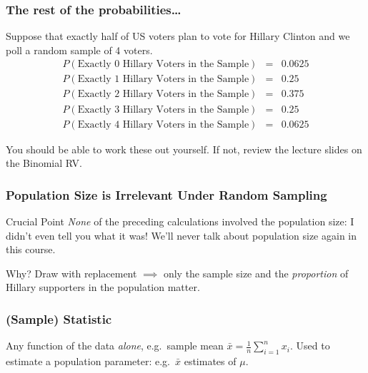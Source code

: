 %
%
\begin{frame}
  \frametitle{The rest of the probabilities\dots}
  Suppose that exactly half of US voters plan to vote for Hillary Clinton and we poll a random sample of 4 voters.
  \begin{eqnarray*}
    P\left( \mbox{Exactly 0 Hillary Voters in the Sample} \right) &=& 0.0625\\
    P\left( \mbox{Exactly 1 Hillary Voters in the Sample} \right) &=& 0.25\\
    P\left( \mbox{Exactly 2 Hillary Voters in the Sample} \right) &=& 0.375\\
    P\left( \mbox{Exactly 3 Hillary Voters in the Sample} \right) &=& 0.25\\
    P\left( \mbox{Exactly 4 Hillary Voters in the Sample} \right) &=& 0.0625 
  \end{eqnarray*}

  \vspace{1em}
  \alert{You should be able to work these out yourself. If not, review the lecture slides on the Binomial RV.}
\end{frame}
\begin{frame}
  \frametitle{Population Size is Irrelevant Under Random Sampling}

  \begin{block}{Crucial Point}
    \emph{None} of the preceding calculations involved the population size: I didn't even tell you what it was!
    We'll never talk about population size again in this course.
  \end{block}

  \begin{block}{Why?}
    Draw with replacement $\implies$ only the sample size and the \emph{proportion} of Hillary supporters in the population matter.
  \end{block}

\end{frame}
\begin{frame}
  \frametitle{(Sample) Statistic}

  Any function of the data \emph{alone}, e.g.\ sample mean $\bar{x} = \frac{1}{n}\sum_{i=1}^n x_i$. 
  Used to estimate a population parameter: e.g.\ $\bar{x}$ estimates of
  $\mu$.

\end{frame}

